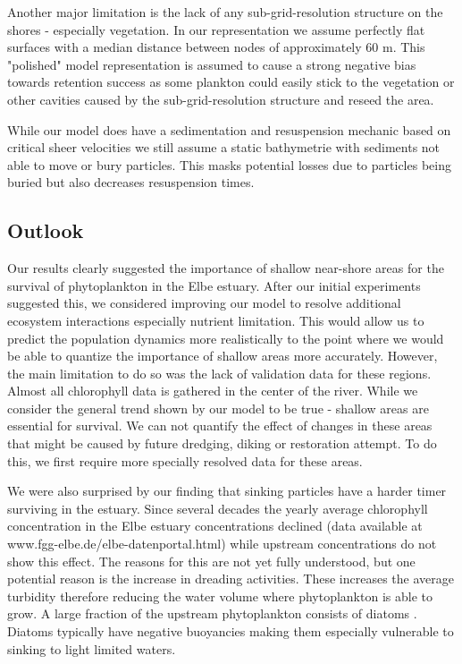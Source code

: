 \documentclass[npg, manuscript]{copernicus}
\begin{document}
Another major limitation is the lack of any sub-grid-resolution structure on the shores - especially vegetation.
In our representation we assume perfectly flat surfaces with a median distance between nodes of approximately 60 \unit{m}.
This "polished" model representation is assumed to cause a strong negative bias towards retention success as some plankton could easily stick to the vegetation or other cavities caused by the sub-grid-resolution structure and reseed the area.

While our model does have a sedimentation and resuspension mechanic based on critical sheer velocities we still assume a static bathymetrie with sediments not able to move or bury particles. 
This masks potential losses due to particles being buried but also decreases resuspension times.

\subsection{Outlook}

Our results clearly suggested the importance of shallow near-shore areas for the survival of phytoplankton in the Elbe estuary.
After our initial experiments suggested this, we considered improving our model to resolve additional ecosystem interactions especially nutrient limitation.
This would allow us to predict the population dynamics more realistically to the point where we would be able to quantize the importance of shallow areas more accurately.
However, the main limitation to do so was the lack of validation data for these regions. 
Almost all chlorophyll data is gathered in the center of the river.
While we consider the general trend shown by our model to be true - shallow areas are essential for survival. We can not quantify the effect of changes in these areas that might be caused by future dredging, diking or restoration attempt.
To do this, we first require more specially resolved data for these areas.

We were also surprised by our finding that sinking particles have a harder timer surviving in the estuary. 
Since several decades the yearly average chlorophyll concentration in the Elbe estuary concentrations declined (data available at www.fgg-elbe.de/elbe-datenportal.html) while upstream concentrations do not show this effect.
The reasons for this are not yet fully understood, but one potential reason is the increase in dreading activities.
These increases the average turbidity therefore reducing the water volume where phytoplankton is able to grow.
A large fraction of the upstream phytoplankton consists of diatoms \citep{Muylaert1999}.
Diatoms typically have negative buoyancies \citep{Passow1991}
making them especially vulnerable to sinking to light limited waters.
\end{document}
